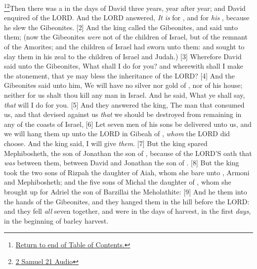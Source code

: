 \footnote{\textcolor[cmyk]{0.99998,1,0,0}{\hyperlink{TOC}{Return to end of Table of Contents.}}}\footnote{\href{https://audiobible.com/bible/2_samuel_21.html}{\textcolor[cmyk]{0.99998,1,0,0}{2 Samuel 21 Audio}}}\textcolor[cmyk]{0.99998,1,0,0}{Then there was a  in the days of David three years, year after year; and David enquired of the LORD. And the LORD answered, \emph{It} \emph{is} for , and for \emph{his} , because he slew the Gibeonites.}
[2] \textcolor[cmyk]{0.99998,1,0,0}{And the king called the Gibeonites, and said unto them; (now the Gibeonites \emph{were} not of the children of Israel, but of the remnant of the Amorites; and the children of Israel had sworn unto them: and  sought to slay them in his zeal to the children of Israel and Judah.)}
[3] \textcolor[cmyk]{0.99998,1,0,0}{Wherefore David said unto the Gibeonites, What shall I do for you? and wherewith shall I make the atonement, that ye may bless the inheritance of the LORD?}
[4] \textcolor[cmyk]{0.99998,1,0,0}{And the Gibeonites said unto him, We will have no silver nor gold of , nor of his house; neither for us shalt thou kill any man in Israel. And he said, What ye shall say, \emph{that} will I do for you.}
[5] \textcolor[cmyk]{0.99998,1,0,0}{And they answered the king, The man that consumed us, and that devised against us \emph{that} we should be destroyed from remaining in any of the coasts of Israel,}
[6] \textcolor[cmyk]{0.99998,1,0,0}{Let seven men of his sons be delivered unto us, and we will hang them up unto the LORD in Gibeah of , \emph{whom} the LORD did choose. And the king said, I will give \emph{them}.}
[7] \textcolor[cmyk]{0.99998,1,0,0}{But the king spared Mephibosheth, the son of Jonathan the son of , because of the LORD'S oath that \emph{was} between them, between David and Jonathan the son of .}
[8] \textcolor[cmyk]{0.99998,1,0,0}{But the king took the two sons of Rizpah the daughter of Aiah, whom she bare unto , Armoni and Mephibosheth; and the five sons of Michal the daughter of , whom she brought up for Adriel the son of Barzillai the Meholathite:}
[9] \textcolor[cmyk]{0.99998,1,0,0}{And he  them into the hands of the Gibeonites, and they hanged them in the hill before the LORD: and they fell \emph{all} seven together, and were  in the days of harvest, in the first \emph{days}, in the beginning of barley harvest.}\\
